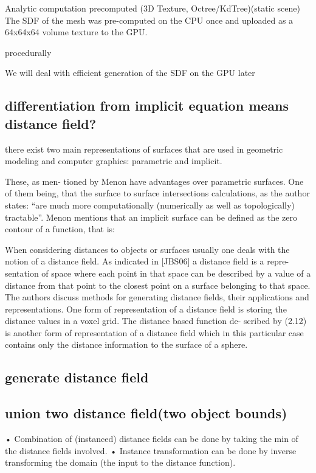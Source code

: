 Analytic computation
precomputed (3D Texture, Octree/KdTree)(static scene)
The SDF of the mesh was pre-computed on the CPU once and uploaded as a 64x64x64 volume texture to the GPU. 

procedurally


We will deal with efficient generation of the SDF on the GPU later

\subsection*{differentiation from implicit equation means distance field?}

there exist two main representations of surfaces that are used in geometric modeling and computer graphics: parametric and implicit.

These, as men- tioned by Menon have advantages over parametric surfaces. One of them being, that the surface to surface intersections calculations, as the author states: “are much more computationally (numerically as well as topologically) tractable”. Menon mentions that an implicit surface can be defined as the zero contour of a function, that is:

When considering distances to objects or surfaces usually one deals with the notion of a distance field. As indicated in [JBS06] a distance field is a repre- sentation of space where each point in that space can be described by a value of a distance from that point to the closest point on a surface belonging to that space. The authors discuss methods for generating distance fields, their applications and representations. One form of representation of a distance field is storing the distance values in a voxel grid. The distance based function de- scribed by (2.12) is another form of representation of a distance field which in this particular case contains only the distance information to the surface of a sphere.

\subsection*{generate distance field}
\subsection*{union two distance field(two object bounds)}
• Combination of (instanced) distance fields can be done by taking the min of the distance fields involved.
• Instance transformation can be done by inverse transforming the domain (the input to the distance function).


